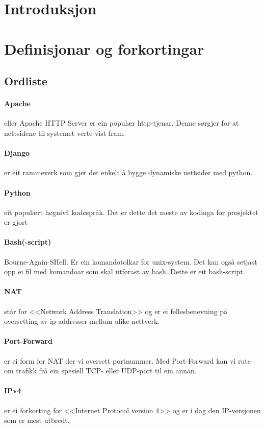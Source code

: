 \documentclass[nynorsk,12pt,a4paper,oneside]{book}
\begin{document}
\section{Introduksjon}

\section{Definisjonar og forkortingar}
\subsection{Ordliste}



\paragraph{Apache} eller Apache HTTP Server er ein populær http-tjenar. Denne sørgjer for at nettsidene til systemet verte vist fram.
\paragraph{Django} er eit rammeverk som gjer det enkelt å bygge dynamiske nettsider med python.
\paragraph{Python} eit populært høgnivå kodespråk. Det er dette det meste av kodinga for prosjektet er gjort
\paragraph{Bash(-script)} Bourne-Again-SHell. Er ein komandotolkar for unix-system. Det kan også setjast opp ei fil med komandoar som skal utførast av bash. Dette er eit bash-script.
\paragraph{NAT} står for <<Network Address Translation>> og er ei fellesbenevning på oversetting av ip-addresser mellom ulike nettverk. 
\paragraph{Port-Forward} er ei form for NAT der vi oversett portnummer. Med Port-Forward kan vi rute om trafikk frå ein spesiell TCP- eller UDP-port til ein annan.
\paragraph{IPv4} er ei forkorting for <<Internet Protocol version 4>> og er i dag den IP-versjonen som er mest utbredt. 
\end{document}
